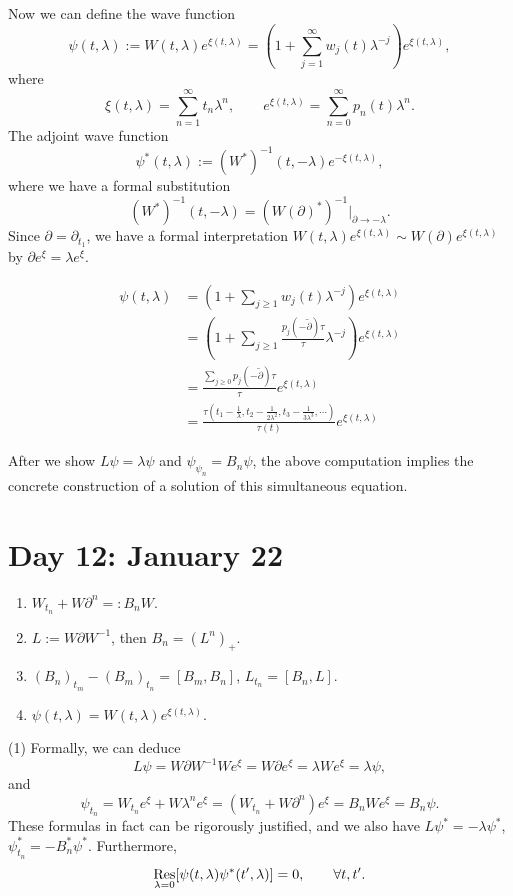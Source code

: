 \documentclass{../../../small}
\begin{document}
Now we can define the wave function
\[\psi(t,\lambda):=W(t,\lambda)e^{\xi(t,\lambda)}=(1+\sum_{j=1}^\infty w_j(t)\lambda^{-j})e^{\xi(t,\lambda)},\]
where
\[\xi(t,\lambda)=\sum_{n=1}^\infty t_n\lambda^n,\qquad e^{\xi(t,\lambda)}=\sum_{n=0}^\infty p_n(t)\lambda^n.\]
The adjoint wave function
\[\psi^*(t,\lambda):=(W^*)^{-1}(t,-\lambda)e^{-\xi(t,\lambda)},\]
where we have a formal substitution
\[(W^*)^{-1}(t,-\lambda)=(W(\partial)^*)^{-1}|_{\partial\to-\lambda}.\]
Since $\partial=\partial_{t_1}$, we have a formal interpretation $W(t,\lambda)e^{\xi(t,\lambda)}\sim W(\partial)e^{\xi(t,\lambda)}$ by $\partial e^\xi=\lambda e^\xi$.

\begin{align*}
\psi(t,\lambda)
&=(1+\sum_{j\ge1}w_j(t)\lambda^{-j})e^{\xi(t,\lambda)}\\
&=(1+\sum_{j\ge1}\frac{p_j(-\tilde\partial)\tau}{\tau}\lambda^{-j})e^{\xi(t,\lambda)}\\
&=\frac{\sum_{j\ge0}p_j(-\tilde\partial)\tau}\tau e^{\xi(t,\lambda)}\\
&=\frac{\tau(t_1-\tfrac1\lambda,t_2-\tfrac1{2\lambda^2},t_3-\tfrac1{3\lambda^3},\cdots)}{\tau(t)}e^{\xi(t,\lambda)}
\end{align*}

After we show $L\psi=\lambda\psi$ and $\psi_{\psi_n}=B_n\psi$, the above computation implies the concrete construction of a solution of this simultaneous equation.


\newpage
\section{Day 12: January 22}

\begin{enumerate}[1)]
\item $W_{t_n}+W\partial^n=:B_nW$.
\item $L:=W\partial W^{-1}$, then $B_n=(L^n)_+$.
\item $(B_n)_{t_m}-(B_m)_{t_n}=[B_m,B_n]$, $L_{t_n}=[B_n,L]$.
\item $\psi(t,\lambda)=W(t,\lambda)e^{\xi(t,\lambda)}$.
\end{enumerate}

(1) Formally, we can deduce
\[L\psi=W\partial W^{-1}We^\xi=W\partial e^\xi=\lambda We^\xi=\lambda\psi,\]
and
\[\psi_{t_n}=W_{t_n}e^\xi+W\lambda^ne^\xi=(W_{t_n}+W\partial^n)e^\xi=B_nWe^\xi=B_n\psi.\]
These formulas in fact can be rigorously justified, and we also have $L\psi^*=-\lambda\psi^*$, $\psi_{t_n}^*=-B_n^*\psi^*$.
Furthermore,
\[\operatorname*{Res}_{\lambda=0}[\psi(t,\lambda)\psi^*(t',\lambda)]=0,\qquad\forall t,t'.\]
\end{document}
